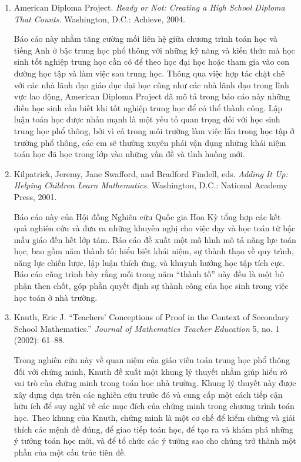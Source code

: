 \documentclass[
  10pt,
  a4paper,
  landscape,
  twoside,
  openany
]{scrbook}
\newcommand{\VI}[1]{#1}
\begin{document}
{
\VI{
  \begin{enumerate}
    \item American Diploma Project. \emph{Ready or Not: Creating a High School Diploma That Counts}. Washington, D.C.: Achieve, 2004.
    
      Báo cáo này nhằm tăng cường mối liên hệ giữa chương trình toán học và tiếng Anh ở bậc trung học phổ thông với những kỹ năng và kiến thức mà học sinh tốt nghiệp trung học cần có để theo học đại học hoặc tham gia vào con đường học tập và làm việc sau trung học. Thông qua việc hợp tác chặt chẽ với các nhà lãnh đạo giáo dục đại học cũng như các nhà lãnh đạo trong lĩnh vực lao động, American Diploma Project đã mô tả trong báo cáo này những điều học sinh cần biết khi tốt nghiệp trung học để có thể thành công. Lập luận toán học được nhấn mạnh là một yếu tố quan trọng đối với học sinh trung học phổ thông, bởi vì cả trong môi trường làm việc lẫn trong học tập ở trường phổ thông, các em sẽ thường xuyên phải vận dụng những khái niệm toán học đã học trong lớp vào những vấn đề và tình huống mới.

    \item Kilpatrick, Jeremy, Jane Swafford, and Bradford Findell, eds. \emph{Adding It Up: Helping Children Learn Mathematics}. Washington, D.C.: National Academy Press, 2001.
    
      Báo cáo này của Hội đồng Nghiên cứu Quốc gia Hoa Kỳ tổng hợp các kết quả nghiên cứu và đưa ra những khuyến nghị cho việc dạy và học toán từ bậc mẫu giáo đến hết lớp tám. Báo cáo đề xuất một mô hình mô tả năng lực toán học, bao gồm năm thành tố: hiểu biết khái niệm, sự thành thạo về quy trình, năng lực chiến lược, lập luận thích ứng, và khuynh hướng học tập tích cực. Báo cáo cũng trình bày rằng mỗi trong năm ``thành tố'' này đều là một bộ phận then chốt, góp phần quyết định sự thành công của học sinh trong việc học toán ở nhà trường.

    \item Knuth, Eric J. ``Teachers' Conceptions of Proof in the Context of Secondary School Mathematics.'' \emph{Journal of Mathematics Teacher Education} 5, no. 1 (2002): 61--88.
    
      Trong nghiên cứu này về quan niệm của giáo viên toán trung học phổ thông đối với chứng minh, Knuth đề xuất một khung lý thuyết nhằm giúp hiểu rõ vai trò của chứng minh trong toán học nhà trường. Khung lý thuyết này được xây dựng dựa trên các nghiên cứu trước đó và cung cấp một cách tiếp cận hữu ích để suy nghĩ về các mục đích của chứng minh trong chương trình toán học. Theo khung của Knuth, chứng minh là một cơ chế để kiểm chứng và giải thích các mệnh đề đúng, để giao tiếp toán học, để tạo ra và khám phá những ý tưởng toán học mới, và để tổ chức các ý tưởng sao cho chúng trở thành một phần của một cấu trúc tiên đề.


\end{enumerate}}}
\end{document}
